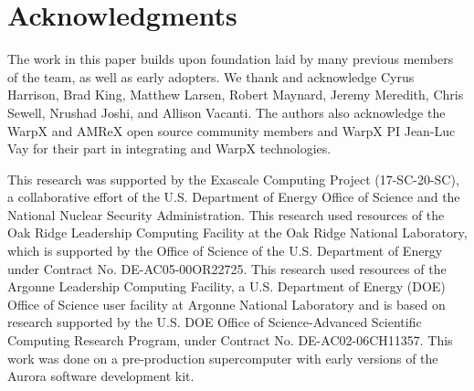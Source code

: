 \section{Acknowledgments}


The work in this paper builds upon foundation laid by many previous members of the \vtkm team, as well as early adopters.  We thank and acknowledge
Cyrus Harrison, 
Brad King, 
Matthew Larsen,
Robert Maynard, 
Jeremy Meredith, 
Chris Sewell,
Nrushad Joshi,
and
Allison Vacanti.
The authors also acknowledge
the WarpX and AMReX open source community members and WarpX PI Jean-Luc Vay
for their part in integrating \vtkm and WarpX technologies.

This research was supported by the Exascale Computing Project (17-SC-20-SC), a collaborative effort of the U.S. Department of Energy Office of Science and the National Nuclear Security Administration.
This research used resources of the Oak Ridge Leadership Computing Facility at the Oak Ridge National Laboratory, which is supported by the Office of Science of the U.S. Department of Energy under Contract No. DE-AC05-00OR22725.
This research used resources of the Argonne Leadership Computing Facility, a U.S. Department of Energy (DOE) Office of Science user facility at Argonne National Laboratory and is based on research supported by the U.S. DOE Office of Science-Advanced Scientific Computing Research Program, under Contract No. DE-AC02-06CH11357. This work was done on a pre-production supercomputer with early versions of the Aurora software development kit.
